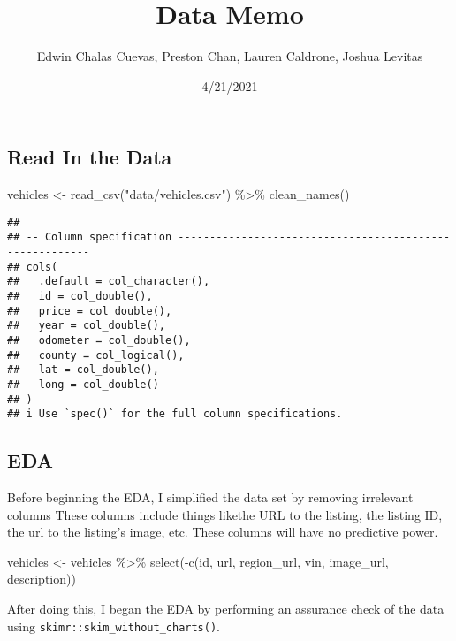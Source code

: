 \documentclass[
]{article}
\title{Data Memo}
\author{Edwin Chalas Cuevas, Preston Chan, Lauren Caldrone, Joshua
Levitas}
\date{4/21/2021}
\newenvironment{Shaded}{\begin{snugshade}}{\end{snugshade}}
\newcommand{\FunctionTok}[1]{\textcolor[rgb]{0.00,0.00,0.00}{#1}}
\newcommand{\NormalTok}[1]{#1}
\newcommand{\OtherTok}[1]{\textcolor[rgb]{0.56,0.35,0.01}{#1}}
\newcommand{\SpecialCharTok}[1]{\textcolor[rgb]{0.00,0.00,0.00}{#1}}
\newcommand{\StringTok}[1]{\textcolor[rgb]{0.31,0.60,0.02}{#1}}
\begin{document}
\maketitle

{
\setcounter{tocdepth}{2}
\tableofcontents
}
\hypertarget{read-in-the-data}{%
\subsection{Read In the Data}\label{read-in-the-data}}

\begin{Shaded}
\begin{Highlighting}[]
\NormalTok{vehicles }\OtherTok{\textless{}{-}} \FunctionTok{read\_csv}\NormalTok{(}\StringTok{"data/vehicles.csv"}\NormalTok{) }\SpecialCharTok{\%\textgreater{}\%} 
  \FunctionTok{clean\_names}\NormalTok{()}
\end{Highlighting}
\end{Shaded}

\begin{verbatim}
## 
## -- Column specification --------------------------------------------------------
## cols(
##   .default = col_character(),
##   id = col_double(),
##   price = col_double(),
##   year = col_double(),
##   odometer = col_double(),
##   county = col_logical(),
##   lat = col_double(),
##   long = col_double()
## )
## i Use `spec()` for the full column specifications.
\end{verbatim}

\hypertarget{eda}{%
\subsection{EDA}\label{eda}}

Before beginning the EDA, I simplified the data set by removing
irrelevant columns These columns include things likethe URL to the
listing, the listing ID, the url to the listing's image, etc. These
columns will have no predictive power.

\begin{Shaded}
\begin{Highlighting}[]
\NormalTok{vehicles }\OtherTok{\textless{}{-}}\NormalTok{ vehicles }\SpecialCharTok{\%\textgreater{}\%} 
  \FunctionTok{select}\NormalTok{(}\SpecialCharTok{{-}}\FunctionTok{c}\NormalTok{(id, url, region\_url, vin, image\_url, description))}
\end{Highlighting}
\end{Shaded}

After doing this, I began the EDA by performing an assurance check of
the data using \texttt{skimr::skim\_without\_charts()}.
\end{document}
